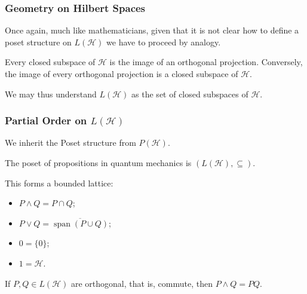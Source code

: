 \documentclass{beamer}
\DeclareMathOperator{\Span}{span}
\begin{document}
\begin{frame}

	\frametitle{Geometry on Hilbert Spaces}
	
	Once again, much like mathematicians, given that it is not clear how to define a poset structure on $L(\mathcal{H})$ we have to proceed by analogy.
	
	\begin{theorem}
	
		Every closed subspace of $\mathcal{H}$ is the image of an orthogonal projection. Conversely, the image of every orthogonal projection is a closed subspace of $\mathcal{H}$.	
	
	\end{theorem}
	
	We may thus understand $L(\mathcal{H})$ as the set of closed subspaces of $\mathcal{H}$.

\end{frame}	

\begin{frame}

	\frametitle{Partial Order on $L(\mathcal{H})$}
	
	We inherit the Poset structure from $P(\mathcal{H})$. 
	
	\begin{definition}
	
		The poset of propositions in quantum mechanics is $(L(\mathcal{H}),\subseteq)$.	
	
	\end{definition}

This forms a bounded lattice:

	\begin{itemize}
	
		\item $P\wedge Q=P\cap Q$;
		\item $P\vee Q = \overline{\Span (P\cup Q)}$;
		\item $0=\{0\}$;
		\item $1=\mathcal{H}$.
	
	\end{itemize}
	
	\begin{theorem}
		
		If $P,Q\in L(\mathcal{H})$ are orthogonal, that is, commute, then $P\wedge Q=PQ$.		
		
	\end{theorem}

\end{frame}
\end{document}
